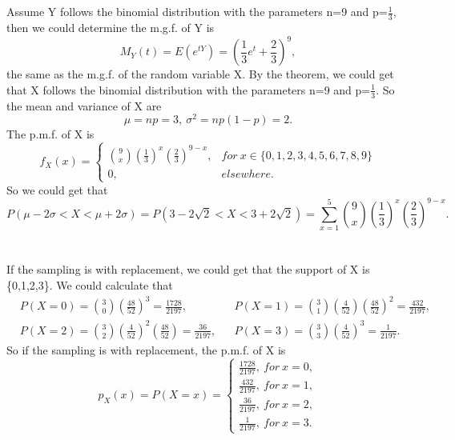 \documentclass[10.5pt]{article}
\begin{document}
\section{}
Assume Y follows the binomial distribution with the parameters n=9 and p=$\frac{1}{3}$, then we could determine the m.g.f. of Y is $$M_Y(t)=E(e^{tY})=\left(\frac{1}{3}e^t+\frac{2}{3}\right)^9,$$\indent
the same as the m.g.f. of the random variable X. By the theorem, we could get that X follows the binomial distribution with the parameters n=9 and p=$\frac{1}{3}$. So the mean and variance of X are $$\mu=np=3,~\sigma^2=np(1-p)=2.$$\indent
The p.m.f. of X is $$f_X(x)=\begin{cases}
    \binom{9}{x}\left(\frac{1}{3}\right)^x\left(\frac{2}{3}\right)^{9-x},&for~x\in\{0,1,2,3,4,5,6,7,8,9\}\\
    0,&elsewhere.
\end{cases}$$\indent
So we could get that $$P(\mu-2\sigma<X<\mu+2\sigma)=P(3-2\sqrt{2}<X<3+2\sqrt{2})=\sum_{x=1}^5\binom{9}{x}\left(\frac{1}{3}\right)^x\left(\frac{2}{3}\right)^{9-x}.$$

\section{}
\subsection{}
If the sampling is with replacement, we could get that the support of X is \{0,1,2,3\}. We could calculate that $$\begin{aligned}
    &P(X=0)=\binom{3}{0}\left(\frac{48}{52}\right)^3=\frac{1728}{2197},& &P(X=1)=\binom{3}{1}\left(\frac{4}{52}\right)\left(\frac{48}{52}\right)^2=\frac{432}{2197},\\
    &P(X=2)=\binom{3}{2}\left(\frac{4}{52}\right)^2\left(\frac{48}{52}\right)=\frac{36}{2197},& &P(X=3)=\binom{3}{3}\left(\frac{4}{52}\right)^3=\frac{1}{2197}.
\end{aligned}$$\indent
So if the sampling is with replacement, the p.m.f. of X is $$p_X(x)=P(X=x)=\begin{cases}
    \frac{1728}{2197},~for~x=0,\\
    \frac{432}{2197},~for~x=1,\\
    \frac{36}{2197},~for~x=2,\\
    \frac{1}{2197},~for~x=3.
\end{cases}$$
\end{document}
